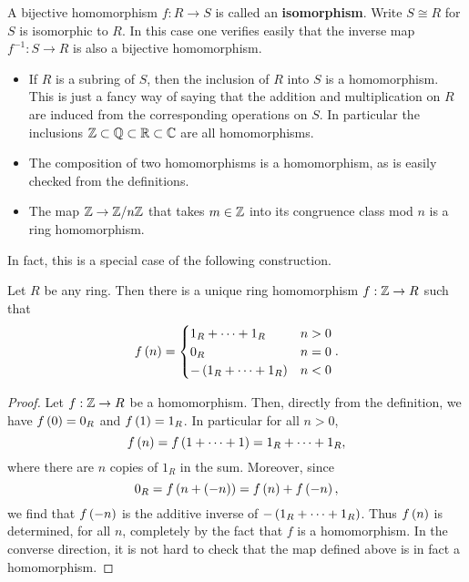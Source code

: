\begin{definition}
A bijective homomorphism $ f : R \to S $ is called an \textbf{isomorphism}. Write $ S \cong R $ for $ S $ is isomorphic to $ R $. In this case one verifies easily that the inverse map $ f^{-1} : S \to R $ is also a bijective homomorphism.
\end{definition}

\begin{example*}
\hfill
\begin{itemize}
\item If $ R $ is a subring of $ S $, then the inclusion of $ R $ into $ S $ is a homomorphism. This is just a fancy way of saying that the addition and multiplication on $ R $ are induced from the corresponding operations on $ S $. In particular the inclusions $ \mathbb{Z} \subset \mathbb{Q} \subset \mathbb{R} \subset \mathbb{C} $ are all homomorphisms.
\item The composition of two homomorphisms is a homomorphism, as is easily checked from the definitions.
\item The map $ \mathbb{Z} \to \mathbb{Z} / n\mathbb{Z} $ that takes $ m \in \mathbb{Z} $ into its congruence class mod $ n $ is a ring homomorphism.
\end{itemize}
\end{example*}

In fact, this is a special case of the following construction.

\begin{proposition}
Let $ R $ be any ring. Then there is a unique ring homomorphism $ f : \mathbb{Z} \to R $ such that
$$ f\left( n \right) =
\begin{cases}
1_R + \dots + 1_R & n > 0 \\
0_R & n = 0 \\
-\left( 1_R + \dots + 1_R \right) & n < 0
\end{cases}.
$$
\end{proposition}

\begin{proof}
Let $ f : \mathbb{Z} \to R $ be a homomorphism. Then, directly from the definition, we have $ f\left( 0 \right) = 0_R $ and $ f\left( 1 \right) = 1_R $. In particular for all $ n > 0 $,
$$ f\left( n \right) = f\left( 1 + \dots + 1 \right) = 1_R + \dots + 1_R, $$
where there are $ n $ copies of $ 1_R $ in the sum. Moreover, since
$$ 0_R = f\left( n + \left( -n \right) \right) = f\left( n \right) + f\left( -n \right), $$
we find that $ f\left( -n \right) $ is the additive inverse of $ -\left( 1_R + \dots + 1_R \right) $. Thus $ f\left( n \right) $ is determined, for all $ n $, completely by the fact that $ f $ is a homomorphism. In the converse direction, it is not hard to check that the map defined above is in fact a homomorphism.
\end{proof}

